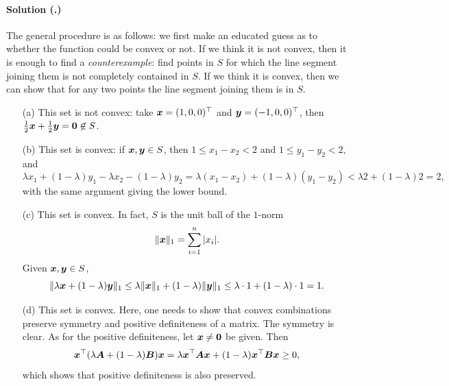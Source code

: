 \documentclass{article}
\newcounter{problemSheetNumber}
\newcounter{problems}
\renewcommand{\solution}[1]{\paragraph{Solution (\theproblemSheetNumber.\theproblems)}\addtocounter{problems}{1}\label{#1}}
\begin{document}
\solution{pr:1} The general procedure is as follows: we first make an educated guess as to whether the function could be convex or not. If we think it is not convex, then it is enough to find a {\em counterexample}: find points in $S$ for which the line segment joining them is not completely contained in $S$. If we think it is convex, then we can show that for any two points the line segment joining them is in $S$.
\begin{itemize}
 \item[(a)] This set is not convex: take $\bm{x}=(1,0,0)^{\top}$ and $\bm{y}=(-1,0,0)^{\top}$, then $\frac{1}{2}\bm{x}+\frac{1}{2}\bm{y}=\bm{0} \not\in S$.
 \item[(b)] This set is convex: if $\bm{x},\bm{y}\in S$, then $1\leq x_1-x_2<2$ and $1\leq y_1-y_2<2$, and
 \begin{equation*}
  \lambda x_1+(1-\lambda)y_1-\lambda x_2-(1-\lambda)y_2 = \lambda (x_1-x_2)+(1-\lambda)(y_1-y_2)<\lambda 2+(1-\lambda)2 = 2,
 \end{equation*}
 with the same argument giving the lower bound. 
 \item[(c)] This set is convex. In fact, $S$ is the unit ball of the $1$-norm
 \begin{equation*}
  \Vert {\bm{x}}\Vert_1 = \sum_{i=1}^n |x_i|.
 \end{equation*}
 Given $\bm{x},\bm{y}\in S$,
 \begin{equation*}
  \Vert {\lambda \bm{x}+(1-\lambda)\bm{y}}\Vert_1 \leq \lambda \Vert {\bm{x}}\Vert_1+(1-\lambda)\Vert {\bm{y}}\Vert_1 \leq \lambda \cdot 1+(1-\lambda)\cdot 1 = 1.
 \end{equation*}
 \item[(d)] This set is convex. Here, one needs to show that convex combinations preserve symmetry and positive definiteness of a matrix. The symmetry is clear. As for the positive definiteness, let $\bm{x}\neq \bm{0}$ be given. Then
 \begin{equation*}
  \bm{x}^{\top}(\lambda \bm{A}+(1-\lambda)\bm{B})\bm{x} = \lambda \bm{x}^{\top}\bm{A}\bm{x}+(1-\lambda)\bm{x}^{\top}\bm{B}\bm{x} \geq 0,
 \end{equation*}
which shows that positive definiteness is also preserved.
\end{itemize}
\end{document}
